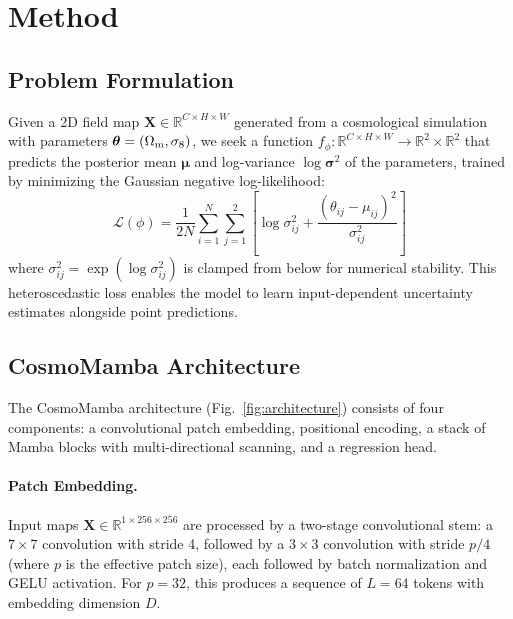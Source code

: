\documentclass[twocolumn,showpacs,preprintnumbers,amsmath,amssymb,aps,prd]{revtex4-2}
\newcommand{\Om}{\Omega_{\rm m}}
\newcommand{\sig}{\sigma_8}
\begin{document}
\section{Method}
\label{sec:method}

\subsection{Problem Formulation}

Given a 2D field map $\mathbf{X} \in \mathbb{R}^{C \times H \times W}$ generated from a
cosmological simulation with parameters $\boldsymbol{\theta} = (\Om, \sig)$, we seek a
function $f_\phi: \mathbb{R}^{C \times H \times W} \to \mathbb{R}^{2} \times
\mathbb{R}^{2}$ that predicts the posterior mean $\boldsymbol{\mu}$ and log-variance
$\log \boldsymbol{\sigma}^2$ of the parameters, trained by minimizing the Gaussian
negative log-likelihood:
%
\begin{equation}
    \mathcal{L}(\phi) = \frac{1}{2N} \sum_{i=1}^{N} \sum_{j=1}^{2}
    \left[ \log \sigma^2_{ij} + \frac{(\theta_{ij} - \mu_{ij})^2}{\sigma^2_{ij}} \right]
    \label{eq:gnll}
\end{equation}
%
where $\sigma^2_{ij} = \exp(\log \sigma^2_{ij})$ is clamped from below for numerical
stability. This heteroscedastic loss enables the model to learn input-dependent
uncertainty estimates alongside point predictions.

\subsection{CosmoMamba Architecture}

The CosmoMamba architecture (Fig.~\ref{fig:architecture}) consists of four components:
a convolutional patch embedding, positional encoding, a stack of Mamba blocks with
multi-directional scanning, and a regression head.

\paragraph{Patch Embedding.}
Input maps $\mathbf{X} \in \mathbb{R}^{1 \times 256 \times 256}$ are processed by a
two-stage convolutional stem: a $7 \times 7$ convolution with stride 4, followed by a
$3 \times 3$ convolution with stride $p/4$ (where $p$ is the effective patch size),
each followed by batch normalization and GELU activation. For $p = 32$, this produces a
sequence of $L = 64$ tokens with embedding dimension $D$.
\end{document}
